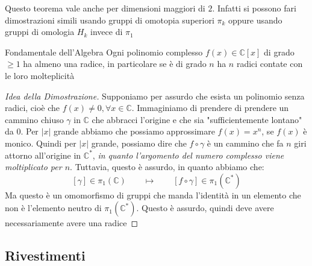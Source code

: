 \documentclass[11pt, a4paper, twoside]{article}
\begin{document}
\begin{oss}
	Questo teorema vale anche per dimensioni maggiori di $2$. Infatti si possono fari dimostrazioni simili usando gruppi di omotopia superiori $\pi_k$ oppure usando gruppi di omologia $H_k$ invece di $\pi_1$
\end{oss}

\begin{thm}{Fondamentale dell'Algebra}{}
	Ogni polinomio complesso $f(x) \in \mathbb C[x]$ di grado $\geq 1$ ha almeno una radice, in particolare se è di grado $n$ ha $n$ radici contate con le loro molteplicità
\end{thm}

\begin{proof}[Idea della Dimostrazione]
	Supponiamo per assurdo che esista un polinomio senza radici, cioè che $f(x) \neq 0, \forall x \in \mathbb C$. Immaginiamo di prendere di prendere un cammino chiuso $\gamma$ in $\mathbb C$ che abbracci l'origine e che sia "sufficientemente lontano" da $0$. Per $|x|$ grande abbiamo che possiamo approssimare $f(x) = x^n$, se $f(x)$ è monico. Quindi per $|x|$ grande, possiamo dire che $f \circ \gamma$ è un cammino che fa $n$ giri attorno all'origine in $\mathbb C^*$, \textit{in quanto l'argomento del numero complesso viene moltiplicato per $n$}.
	Tuttavia, questo è assurdo, in quanto abbiamo che:
	\[ [\gamma] \in \pi_1(\mathbb C) \qquad \mapsto \qquad [f \circ \gamma] \in \pi_1(\mathbb C^*) \]
	Ma questo è un omomorfismo di gruppi che manda l'identità in un elemento che non è l'elemento neutro di $\pi_1(\mathbb C^*)$. Questo è assurdo, quindi deve avere necessariamente avere una radice
\end{proof}

\subsection{Rivestimenti}
\end{document}
